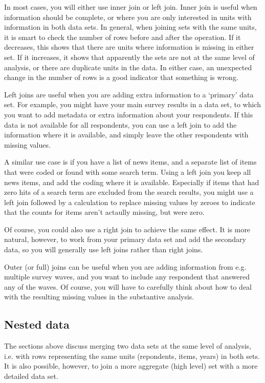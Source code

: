 

In most cases, you will either use inner join or left join.
Inner join is useful when information should be complete,
or where you are only interested in units with information in both data sets.
In general, when joining sets with the same units, it is smart to check the number of rows before and after the operation.
If it decreases, this shows that there are units where information is missing in either set.
If it increases, it shows that apparently the sets are not at the same level of analysis,
or there are duplicate units in the data.
In either case, an unexpected change in the number of rows is a good indicator that something is wrong.

Left joins are useful when you are adding extra information to a `primary' data set.
For example, you might have your main survey results in a data set,
to which you want to add metadata or extra information about your respondents.
If this data is not available for all respondents, you can use a left join to add the information
where it is available, and simply leave the other respondents with missing values.

A similar use case is if you have a list of news items, and a separate list of items that were coded
or found with some search term. Using a left join you keep all news items, and add the coding where it is available.
Especially if items that had zero hits of a search term are excluded from the search results,
you might use a left join followed by a calculation to replace missing values by zeroes to indicate that the counts for
items aren't actaully missing, but were zero. 

Of course, you could also use a right join to achieve the same effect.
It is more natural, however, to work from your primary data set and add the secondary data,
so you will generally use left joins rather than right joins.

Outer (or full) joins can be useful when you are adding information from e.g. multiple survey waves,
and you want to include any respondent that answered any of the waves.
Of course, you will have to carefully think about how to deal with the resulting missing values in the substantive analysis. 

\subsection{Nested data}

The sections above discuss merging two data sets at the same level of analysis,
i.e. with rows representing the same units (repondents, items, years) in both sets.
It is also possible, however, to join a more aggregate (high level) set with a more detailed data set.

